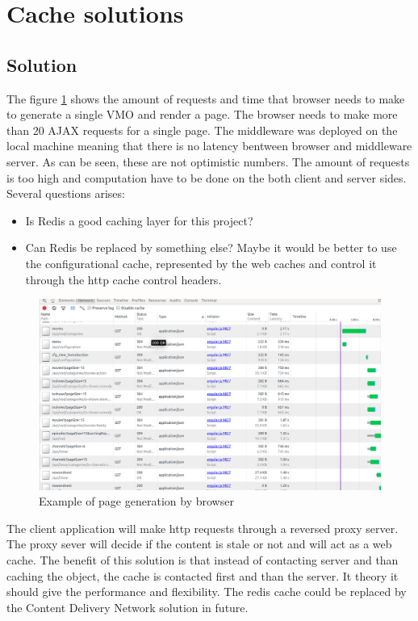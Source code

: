 \section{Cache solutions}

\subsection{Solution}

The figure \ref{fig:req_amount} shows the amount of requests and time that browser needs to make to generate a single VMO and  render a page. The browser needs to make more than 20 AJAX requests for a single page. The middleware was deployed on the local machine meaning that there is no latency bentween browser and middleware server. As can be seen, these are not optimistic numbers. The amount of requests is too high and computation have to be done on the both client and server sides. Several questions arises:
\begin{itemize}
	\item Is Redis a good caching layer for this project?
	\item Can Redis be replaced by something else? Maybe it would be better to use the configurational cache, represented by the web caches and control it through the http cache control headers.
\end{itemize}


\begin{figure}[h]
    \centering
	\includegraphics[width=\textwidth]{images/amount_of_requests.png}
    \caption{Example of page generation by browser}
    \label{fig:req_amount}
\end{figure}


The client application will make http requests through a reversed proxy server. The proxy sever will decide if the content is stale or not and will act as a web cache. The benefit of this solution is that instead of contacting server and than caching the object, the cache is contacted first and than the server. It theory it should give the performance and flexibility. The redis cache could be replaced by the Content Delivery Network solution in future. 

